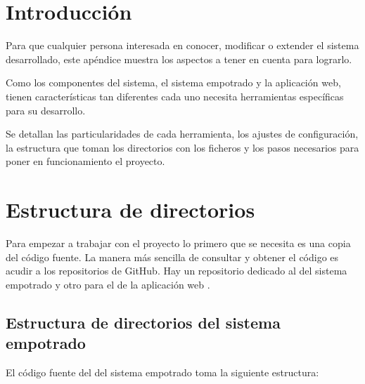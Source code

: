 \label{ch:man-dev}

\section{Introducción} \label{sec:man-dev-intro}
Para que cualquier persona interesada en conocer, modificar o extender
el sistema desarrollado, este apéndice muestra los aspectos a tener en cuenta
para lograrlo.

Como los componentes del sistema, el sistema empotrado y la aplicación web,
tienen características tan diferentes cada uno necesita herramientas específicas
para su desarrollo.

Se detallan las particularidades de cada herramienta, los ajustes de
configuración, la estructura que toman los directorios con los ficheros
y los pasos necesarios para poner en funcionamiento el proyecto.



\section{Estructura de directorios} \label{sec:man-dev-struct}
Para empezar a trabajar con el proyecto lo primero que se necesita es una
copia del código fuente. La manera más sencilla de consultar y obtener el código
es acudir a los repositorios de GitHub. Hay un repositorio dedicado al \sw{}
del sistema empotrado \cite{webpage:repo-se} y otro para el \sw{} de la
aplicación web \cite{webpage:repo-aw}.


\subsection{Estructura de directorios del sistema empotrado}
\label{sec:man-dev-struct-se}
El código fuente del \sw{} del sistema empotrado toma la siguiente estructura:

